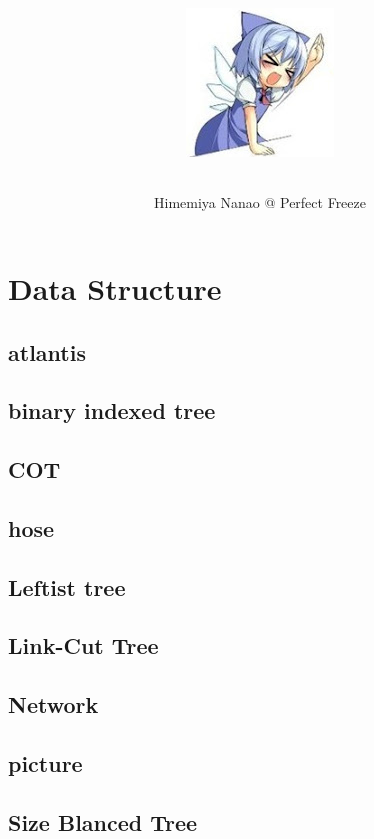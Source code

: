 \documentclass[a4paper,5pt,twocolumn,titlepage]{article}
\title{\TitleFont{Code Library}
\begin{center}
\includegraphics[scale=2]{./image1.png}
\end{center}
}
\author{Himemiya Nanao @ Perfect Freeze}
\begin{document}
\maketitle \tableofcontents
\newpage
{}


\section{Data Structure}
\subsection{atlantis}

\subsection{binary indexed tree}

\subsection{COT}

\subsection{hose}

\subsection{Leftist tree}

\subsection{Link-Cut Tree}

\subsection{Network}

\subsection{picture}

\subsection{Size Blanced Tree}

\end{document}
